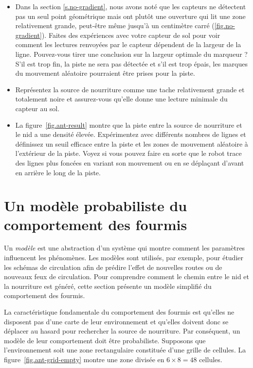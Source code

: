 \begin{framed}
\begin{itemize}
\item Dans la section \ref{s.no-gradient}, nous avons noté que les capteurs ne détectent pas un seul point géométrique mais ont plutôt une ouverture qui lit une zone relativement grande, peut-être même jusqu'à un centimètre carré (\ref{fig.no-gradient}). Faites des expériences avec votre capteur de sol pour voir comment les lectures renvoyées par le capteur dépendent de la largeur de la ligne. Pouvez-vous tirer une conclusion sur la largeur optimale du marqueur ? S'il est trop fin, la piste ne sera pas détectée et s'il est trop épais, les marques du mouvement aléatoire pourraient être prises pour la piste.
\item Représentez la source de nourriture comme une tache relativement grande et totalement noire et assurez-vous qu'elle donne une lecture minimale du capteur au sol.
\item La figure~\ref{fig.ant-result} montre que la piste entre la source de nourriture et le nid a une densité élevée. Expérimentez avec différents nombres de lignes et définissez un seuil efficace entre la piste et les zones de mouvement aléatoire à l'extérieur de la piste. Voyez si vous pouvez faire en sorte que le robot trace des lignes plus foncées en variant son mouvement ou en se déplaçant d'avant en arrière le long de la piste.
\end{itemize}
\end{framed}


\section[Un modèle probabiliste]{Un modèle probabiliste du comportement des fourmis}\label{s.ant-probabilistic}

Un \emph{modèle} est une abstraction d'un système qui montre comment les paramètres influencent les phénomènes. Les modèles sont utilisés, par exemple, pour étudier les schémas de circulation afin de prédire l'effet de nouvelles routes ou de nouveaux feux de circulation. Pour comprendre comment le chemin entre le nid et la nourriture est généré, cette section présente un modèle simplifié du comportement des fourmis. 

La caractéristique fondamentale du comportement des fourmis est qu'elles ne disposent pas d'une carte de leur environnement et qu'elles doivent donc se déplacer au hasard pour rechercher la source de nourriture. Par conséquent, un modèle de leur comportement doit être probabiliste. Supposons que l'environnement soit une zone rectangulaire constituée d'une grille de cellules. La figure~\ref{fig.ant-grid-empty} montre une zone divisée en $6\times 8=48$ cellules.


